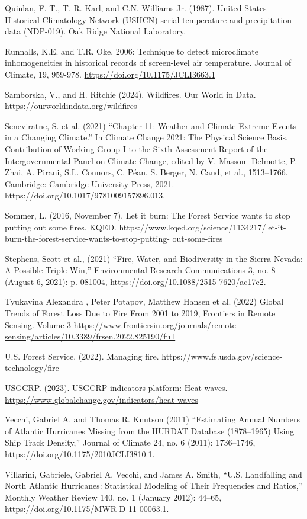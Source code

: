 \documentclass[12pt,paper=a4,DIV=12,parskip=never,chapterprefix=false,headings=standardclasses]{scrreprt}
\begin{document}
Quinlan, F. T., T. R. Karl, and C.N. Williams Jr. (1987). United States Historical Climatology Network
(USHCN) serial temperature and precipitation data (NDP-019). Oak Ridge National Laboratory.

Runnalls, K.E. and T.R. Oke, 2006: Technique to detect microclimate inhomogeneities in historical
records of screen-level air temperature. Journal of Climate, 19, 959-978.
\url{https://doi.org/10.1175/JCLI3663.1}

Samborska, V., and H. Ritchie (2024). Wildfires. Our World in Data. \url{https://ourworldindata.org/wildfires}

Seneviratne, S. et al. (2021) “Chapter 11: Weather and Climate Extreme Events in a Changing Climate.”
In Climate Change 2021: The Physical Science Basis. Contribution of Working Group I to the Sixth
Assessment Report of the Intergovernmental Panel on Climate Change, edited by V. Masson-
Delmotte, P. Zhai, A. Pirani, S.L. Connors, C. Péan, S. Berger, N. Caud, et al., 1513–1766.
Cambridge: Cambridge University Press, 2021. https://doi.org/10.1017/9781009157896.013.

Sommer, L. (2016, November 7). Let it burn: The Forest Service wants to stop putting out some fires.
KQED. https://www.kqed.org/science/1134217/let-it-burn-the-forest-service-wants-to-stop-putting-
out-some-fires

Stephens, Scott et al., (2021) “Fire, Water, and Biodiversity in the Sierra Nevada: A Possible Triple Win,”
Environmental Research Communications 3, no. 8 (August 6, 2021): p. 081004,
https://doi.org/10.1088/2515-7620/ac17e2.

Tyukavina Alexandra , Peter Potapov, Matthew Hansen et al. (2022) Global Trends of Forest Loss Due to
Fire From 2001 to 2019, Frontiers in Remote Sensing. Volume 3
\url{https://www.frontiersin.org/journals/remote-sensing/articles/10.3389/frsen.2022.825190/full}

U.S. Forest Service. (2022). Managing fire. https://www.fs.usda.gov/science-technology/fire

USGCRP. (2023). USGCRP indicators platform: Heat waves.
\url{https://www.globalchange.gov/indicators/heat-waves}

Vecchi, Gabriel A. and Thomas R. Knutson (2011) “Estimating Annual Numbers of Atlantic Hurricanes
Missing from the HURDAT Database (1878–1965) Using Ship Track Density,” Journal of Climate
24, no. 6 (2011): 1736–1746, https://doi.org/10.1175/2010JCLI3810.1.

Villarini, Gabriele, Gabriel A. Vecchi, and James A. Smith, “U.S. Landfalling and North Atlantic
Hurricanes: Statistical Modeling of Their Frequencies and Ratios,” Monthly Weather Review 140, no.
1 (January 2012): 44–65, https://doi.org/10.1175/MWR-D-11-00063.1.
\end{document}
